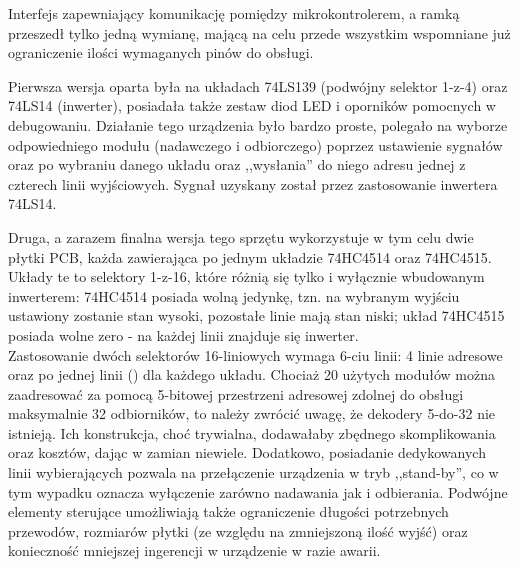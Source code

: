 Interfejs zapewniający komunikację pomiędzy mikrokontrolerem, a ramką przeszedł tylko jedną wymianę, mającą na celu przede wszystkim wspomniane już ograniczenie ilości wymaganych pinów do obsługi.

Pierwsza wersja oparta była na układach 74LS139 (podwójny selektor 1-z-4) oraz 74LS14 (inwerter), posiadała także zestaw diod LED i oporników pomocnych w debugowaniu. Działanie tego urządzenia było bardzo proste, polegało na wyborze odpowiedniego modułu (nadawczego i odbiorczego) poprzez ustawienie sygnałów  oraz  po wybraniu danego układu oraz ,,wysłania'' do niego adresu jednej z czterech linii wyjściowych. Sygnał  uzyskany został przez zastosowanie inwertera 74LS14.

Druga, a zarazem finalna wersja tego sprzętu wykorzystuje w tym celu dwie płytki PCB, każda zawierająca po jednym układzie 74HC4514 oraz 74HC4515. Układy te to selektory 1-z-16, które różnią się tylko i wyłącznie wbudowanym inwerterem: 74HC4514 posiada wolną jedynkę, tzn. na wybranym wyjściu ustawiony zostanie stan wysoki, pozostałe linie mają stan niski; układ 74HC4515 posiada wolne zero - na każdej linii znajduje się inwerter.\\

Zastosowanie dwóch selektorów 16-liniowych wymaga 6-ciu linii: 4 linie adresowe oraz po jednej linii  () dla każdego układu. Chociaż 20 użytych modułów można zaadresować za pomocą 5-bitowej przestrzeni adresowej zdolnej do obsługi maksymalnie 32 odbiorników, to należy zwrócić uwagę, że dekodery 5-do-32 nie istnieją. Ich konstrukcja, choć trywialna, dodawałaby zbędnego skomplikowania oraz kosztów, dając w zamian niewiele.
Dodatkowo, posiadanie dedykowanych linii wybierających pozwala na przełączenie urządzenia w tryb ,,stand-by'', co w tym wypadku oznacza wyłączenie zarówno nadawania jak i odbierania. Podwójne elementy sterujące umożliwiają także ograniczenie długości potrzebnych przewodów, rozmiarów płytki (ze względu na zmniejszoną ilość wyjść) oraz konieczność mniejszej ingerencji w urządzenie w razie awarii.